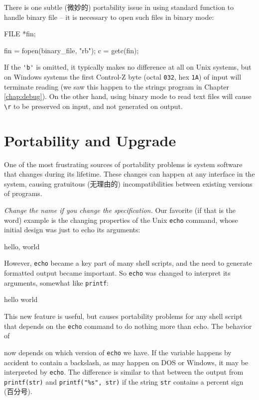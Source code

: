 There is one subtle (微妙的) portability issue in using standard function
to handle binary file -- it is necessary to open such files in binary mode:
\begin{wellcode}
    FILE *fin;

    fin = fopen(binary_file, "rb");
    c = getc(fin);
\end{wellcode}

If the \verb"'b'" is omitted, it typically makes no difference at all on
Unix systems, but on Windows systems the first Control-Z byte (octal
\verb'032', hex \verb'1A') of input will terminate reading (we saw this
happen to the strings program in Chapter \ref{chap:debug}). On the other
hand, using binary mode to read text files will cause \verb'\r' to be
preserved on input, and not generated on output.

\section{Portability and Upgrade}
\label{sec:portability_upgrade}

One of the most frustrating sources of portability problems is system
software that changes during its lifetime. These changes can happen at any
interface in the system, causing gratuitous (无理由的) incompatibilities
between existing versions of programs.

\emph{Change the name if you change the specification.} Our favorite (if
that is the word) example is the changing properties of the Unix
\verb'echo' command, whose initial design was just to echo its arguments:
\begin{wellcode}
    hello, world
\end{wellcode}
However, \verb'echo' became a key part of many shell scripts, and the need
to generate formatted output became important. So \verb'echo' was changed
to interpret its arguments, somewhat like \verb'printf':
\begin{wellcode}
    hello
    world
\end{wellcode}
This new feature is useful, but causes portability problems for any shell
script that depends on the \verb'echo' command to do nothing more than
echo. The behavior of
\begin{wellcode}
\end{wellcode}
now depends on which version of \verb'echo' we have. If the variable
happens by accident to contain a backslash, as may happen on DOS or
Windows, it may be interpreted by \verb'echo'. The difference is similar to
that between the output from \verb'printf(str)' and
\verb'printf("%s", str)' if the string \verb'str' contains a percent sign
(百分号).

